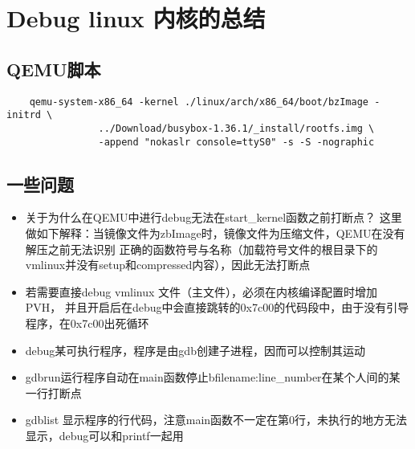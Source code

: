 \section{Debug linux 内核的总结}
  \subsection{QEMU脚本}
  \begin{lstlisting}
    qemu-system-x86_64 -kernel ./linux/arch/x86_64/boot/bzImage -initrd \
                ../Download/busybox-1.36.1/_install/rootfs.img \
                -append "nokaslr console=ttyS0" -s -S -nographic
  \end{lstlisting}
 
  \subsection{一些问题}
    \begin{itemize}
      \item 关于为什么在QEMU中进行debug无法在start\_kernel函数之前打断点？
      这里做如下解释：当镜像文件为zbImage时，镜像文件为压缩文件，QEMU在没有解压之前无法识别
      正确的函数符号与名称（加载符号文件的根目录下的vmlinux并没有setup和compressed内容），因此无法打断点
      \item  若需要直接debug vmlinux 文件（主文件），必须在内核编译配置时增加PVH，
      并且开启后在debug中会直接跳转的0x7c00的代码段中，由于没有引导程序，在0x7c00出死循环
      \item debug\quad 某可执行程序，程序是由gdb创建子进程，因而可以控制其运动
      \item gdbrun\quad 运行程序自动在main函数停止\quad b\quad filename:line\_number\quad 在某个人间的某一行打断点
      \item gdb\quad list 显示程序的行代码，注意main函数不一定在第0行，未执行的地方无法显示，debug可以和printf一起用
   \end{itemize}
    